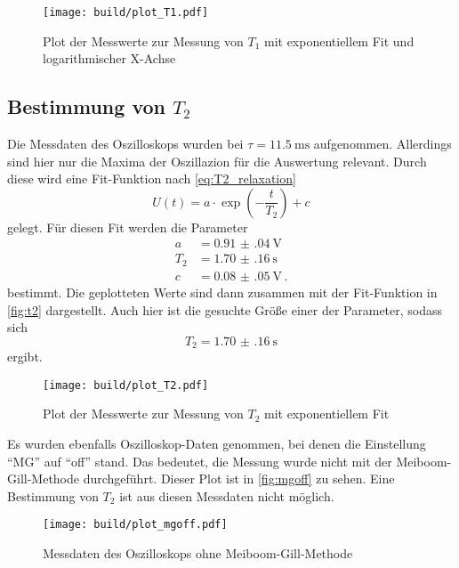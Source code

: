 \begin{figure}
    \centering
    \texttt{[image: build/plot\_T1.pdf]}
    \caption{Plot der Messwerte zur Messung von $T_1$ mit exponentiellem Fit und logarithmischer X-Achse}
    \label{fig:t1}
\end{figure}

\subsection{Bestimmung von \texorpdfstring{$T_2$}{T2}}
\label{ssec:aus2}

Die Messdaten des Oszilloskops wurden bei $\tau = \SI{11.5}{\milli\second}$ aufgenommen.
Allerdings sind hier nur die Maxima der Oszillazion für die Auswertung relevant.
Durch diese wird eine Fit-Funktion nach \autoref{eq:T2_relaxation}
\begin{equation}
    U(t) = a \cdot \exp\left(-\frac{t}{T_2}\right) + c 
    \label{eq:fit_t2}
\end{equation}
gelegt.
Für diesen Fit werden die Parameter 
\begin{align*}
    a &= \SI{0.91(04)}{\volt} \\
    T_2 &= \SI{1.70(16)}{\second} \\
    c &= \SI{0.08(05)}{\volt} \, .
\end{align*}
bestimmt.
Die geplotteten Werte sind dann zusammen mit der Fit-Funktion in \autoref{fig:t2} dargestellt.
Auch hier ist die gesuchte Größe einer der Parameter, sodass sich 
\begin{equation*}
    T_2 = \SI{1.70(16)}{\second} 
    \label{eq:t2_wert}
\end{equation*}
ergibt.

\begin{figure}
    \centering
    \texttt{[image: build/plot\_T2.pdf]}
    \caption{Plot der Messwerte zur Messung von $T_2$ mit exponentiellem Fit}
    \label{fig:t2}
\end{figure}

Es wurden ebenfalls Oszilloskop-Daten genommen, bei denen die Einstellung \enquote{MG} auf \enquote{off} stand.
Das bedeutet, die Messung wurde nicht mit der Meiboom-Gill-Methode durchgeführt.
Dieser Plot ist in \autoref{fig:mgoff} zu sehen.
Eine Bestimmung von $T_2$ ist aus diesen Messdaten nicht möglich.

\begin{figure}
    \centering
    \texttt{[image: build/plot\_mgoff.pdf]}
    \caption{Messdaten des Oszilloskops ohne Meiboom-Gill-Methode}
    \label{fig:mgoff}
\end{figure}

